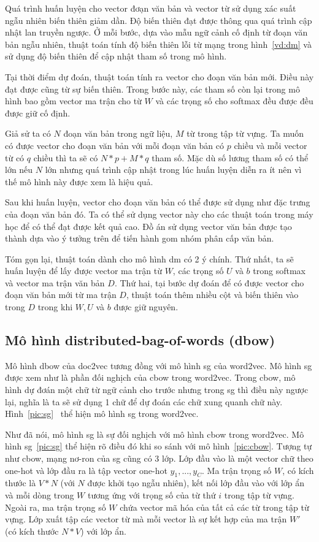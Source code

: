 Quá trình huấn luyện cho vector đơạn văn bản và vector từ sử dụng xác suất ngẫu nhiên biến thiên giảm dần.
Độ biến thiên đạt được thông qua quá trình cập nhật lan truyền ngược.
Ở mỗi bước, dựa vào mẫu ngữ cảnh cố định từ đoạn văn bản ngẫu nhiên, thuật toán tính độ biến thiên lỗi từ mạng trong hình~\ref{vd:dm} và sử dụng độ biến thiên để cập nhật tham số trong mô hình.

Tại thời điểm dự đoán, thuật toán tính ra vector cho đoạn văn bản mới.
Điều này đạt được cũng từ sự biến thiên.
Trong bước này, các tham số còn lại trong mô hình bao gồm vector ma trận cho từ $W$ và các trọng số cho softmax đều được đều được giữ cố định.

Giả sử ta có $N$ đoạn văn bản trong ngữ liệu, $M$ từ trong tập từ vựng.
Ta muốn có được vector cho đoạn văn bản với mỗi đoạn văn bản có $p$ chiều và mỗi vector từ có $q$ chiều thì ta sẽ có $N * p + M * q$ tham số.
Mặc dù số lương tham số có thể lớn nếu $N$ lớn nhưng quá trình cập nhật trong lúc huấn luyện diễn ra ít nên vì thế mô hình này được xem là hiệu quả.

Sau khi huấn luyện, vector cho đoạn văn bản có thể được sử dụng như đặc trưng của đoạn văn bản đó.
Ta có thể sử dụng vector này cho các thuật toán trong máy học để có thể đạt được kết quả cao.
Đồ án sử dụng vector văn bản được tạo thành dựa vào ý tưởng trên để tiến hành gom nhóm phân cấp văn bản.

Tóm gọn lại, thuật toán dành cho mô hình dm có 2 ý chính.
Thứ nhất, ta sẽ huấn luyện để lấy được vector ma trận từ $W$, các trọng số $U$ và $b$ trong softmax và vector ma trận văn bản $D$.
Thứ hai, tại bước dự đoán để có được vector cho đoạn văn bản mới từ ma trận $D$, thuật toán thêm nhiều cột và biến thiên vào trong $D$ trong khi $W, U$ và $b$ được giữ nguyên.

\subsection{Mô hình distributed-bag-of-words (dbow)}
Mô hình dbow của doc2vec tương đồng với mô hình sg của word2vec.
Mô hình sg được xem như là phần đối nghịch của cbow trong word2vec.
Trong cbow, mô hình dự đơán một chữ từ ngữ cảnh cho trước nhưng trong sg thì điều này ngược lại, nghĩa là ta sẽ sử dụng 1 chữ để dự đoán các chữ xung quanh chữ này.
Hình~\ref{pic:sg}~\cite{word2vec-sg} thể hiện mô hình sg trong word2vec.

Như đã nói, mô hình sg là sự đối nghịch với mô hình cbow trong word2vec.
Mô hình sg~\ref{pic:sg} thể hiện rõ điều đó khi so sánh với mô hình~\ref{pic:cbow}.
Tượng tự như cbow, mạng nơ-ron của sg cũng có 3 lớp.
Lớp đầu vào là một vector chữ theo one-hot và lớp đầu ra là tập vector one-hot $y_1, ..., y_C$.
Ma trận trọng số $W$, có kích thước là $V * N$ (với $N$ được khởi tạo ngẫu nhiên), kết nối lớp đầu vào với lớp ẩn và mỗi dòng trong $W$ tương ứng với trọng số của từ thứ $i$ trong tập từ vựng.
Ngoài ra, ma trận trọng số $W$ chứa vector mã hóa của tất cả các từ trong tập từ vựng.
Lớp xuất tập các vector từ mà mỗi vector là sự kết hợp của ma trận $W'$ (có kích thước $N * V$) với lớp ẩn.


